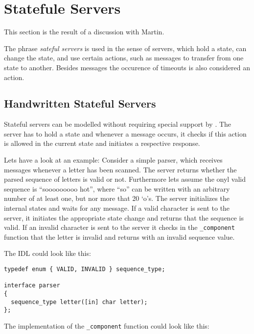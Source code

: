 \section{Statefule Servers}

This section is the result of a discussion with Martin.

The phrase \emph{sateful servers} is used in the sense of servers, which
hold a state, can change the state, and use certain actions, such as
messages to transfer from one state to another.  Besides messages the 
occurence of timeouts is also considered an action.

\subsection{Handwritten Stateful Servers}
Stateful servers can be modelled without requiring special support by \dice{}.
The server has to hold a state and whenever a message occurs, it checks if
this action is allowed in the current state and initiates a respective 
response.

Lets have a look at an example: Consider a simple parser, which receives
messages whenever a letter has been scanned.  The server returns whether
the parsed sequence of letters is valid or not.  Furthermore lets assume
the onyl valid sequence is ``sooooooooo hot'', where ``so'' can be written
with an arbitrary number of at least one, but nor more that 20 `o's.  The
server initializes the internal states and waits for any message.  If
a valid character is sent to the server, it initiates the appropriate state
change and returns that the sequence is valid.  If an invalid character is
sent to the server it checks in the \verb|_component| function that the
letter is invalid and returns with an invalid sequence value.

The IDL could look like this:

\begin{verbatim}
typedef enum { VALID, INVALID } sequence_type;

interface parser
{
  sequence_type letter([in] char letter);
};
\end{verbatim}

The implementation of the \verb|_component| function could look like this:

